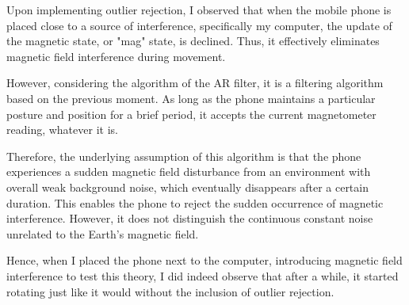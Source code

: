 Upon implementing outlier rejection, I observed that when the mobile phone is placed close to a source of interference, specifically my computer, the update of the magnetic state, or "mag" state, is declined. Thus, it effectively eliminates magnetic field interference during movement.

However, considering the algorithm of the AR filter, it is a filtering algorithm based on the previous moment. As long as the phone maintains a particular posture and position for a brief period, it accepts the current magnetometer reading, whatever it is.

Therefore, the underlying assumption of this algorithm is that the phone experiences a sudden magnetic field disturbance from an environment with overall weak background noise, which eventually disappears after a certain duration. This enables the phone to reject the sudden occurrence of magnetic interference. However, it does not distinguish the continuous constant noise unrelated to the Earth's magnetic field.

Hence, when I placed the phone next to the computer, introducing magnetic field interference to test this theory, I did indeed observe that after a while, it started rotating just like it would without the inclusion of outlier rejection.


